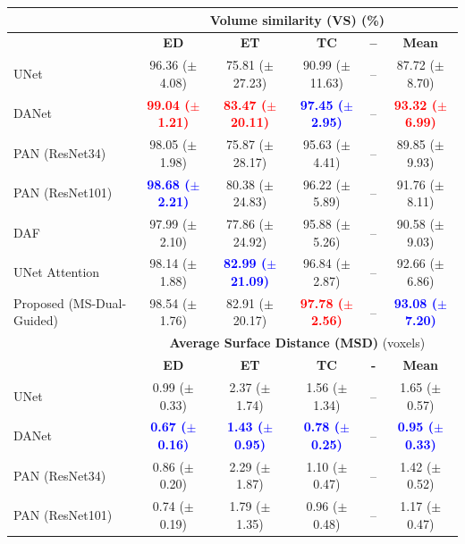 \documentclass[journal]{IEEEtran}
\begin{document}
\begin{table}[t!]
\begin{tabular}{lcccc|c}
\midrule
& \multicolumn{5}{c}{\textbf{Volume similarity (VS)} (\%)}\\
 \midrule
 & \textbf{ED} & \textbf{ET} & \textbf{TC} & \textbf{--} & \textbf{Mean}  \\
 \midrule
UNet \cite{ronneberger2015u}  &  96.36 ($\pm$4.08)& 75.81 ($\pm$27.23)& 90.99  ($\pm$11.63)& --& 87.72 ($\pm$8.70)\\
DANet \cite{fu2018dual}  &  \textcolor{red}{\textbf{99.04 ($\pm$1.21)}} & \textcolor{red}{\textbf{83.47 ($\pm$20.11)}}& \textcolor{blue}{\textbf{97.45 ($\pm$2.95)}} & --& \textcolor{red}{\textbf{93.32 ($\pm$6.99)}}  \\
PAN (ResNet34) \cite{li2018pyramid}   &  98.05 ($\pm$1.98)& 75.87 ($\pm$28.17)& 95.63 ($\pm$4.41)& -- & 89.85 ($\pm$9.93)  \\
PAN (ResNet101) \cite{li2018pyramid}   &  \textcolor{blue}{\textbf{98.68 ($\pm$2.21)}} & 80.38 ($\pm$24.83)& 96.22 ($\pm$5.89) & -- & 91.76 ($\pm$8.11)\\
DAF \cite{wang18d}  &  97.99 ($\pm$2.10) & 77.86 ($\pm$24.92) & 95.88 ($\pm$5.26) & -- &   90.58 ($\pm$9.03)  \\
UNet Attention \cite{schlemper2019attention}  &   98.14 ($\pm$1.88) & \textcolor{blue}{\textbf{82.99 ($\pm$21.09)}}& 96.84 ($\pm$2.87) & -- &  92.66 ($\pm$6.86)  \\
Proposed (MS-Dual-Guided)  & 98.54 ($\pm$1.76) & 82.91 ($\pm$20.17) &  \textcolor{red}{\textbf{97.78 ($\pm$2.56)}} &-- & \textcolor{blue}{\textbf{93.08 ($\pm$7.20)}} \\
\midrule
& \multicolumn{5}{c}{\textbf{Average Surface Distance (MSD)} (voxels)}\\
 \midrule
 & \textbf{ED} & \textbf{ET} & \textbf{TC} & \textbf{-} & \textbf{Mean}  \\
 \midrule
UNet \cite{ronneberger2015u}  & 0.99 ($\pm$0.33)& 2.37 ($\pm$1.74)& 1.56 ($\pm$1.34)& -- & 1.65 ($\pm$0.57) \\
DANet \cite{fu2018dual}  &  \textcolor{blue}{\textbf{0.67 ($\pm$0.16)}} & \textcolor{blue}{\textbf{1.43 ($\pm$0.95)}}& \textcolor{blue}{\textbf{0.78 ($\pm$0.25)}} & -- & \textcolor{blue}{\textbf{0.95  ($\pm$0.33)}}   \\
PAN (ResNet34)\cite{li2018pyramid}   & 0.86 ($\pm$0.20)  & 2.29 ($\pm$1.87) & 1.10 ($\pm$0.47) & -- & 1.42 ($\pm$0.52) \\
PAN (ResNet101) \cite{li2018pyramid}   & 0.74 ($\pm$0.19)  & 1.79 ($\pm$1.35) & 0.96 ($\pm$0.48) & -- & 1.17 ($\pm$0.47) \\

\end{tabular}
\end{table}
\end{document}
